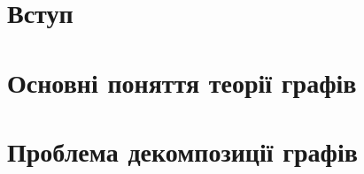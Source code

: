 \documentclass[a4paper,14pt,ukrainian]{extarticle}
\begin{document}


\tableofcontents
\newpage

\section*{Вступ}

\newpage

\section{Основні поняття теорії графів}

\newpage

\section{Проблема декомпозиції графів}


\clearpage
{}


\end{document}
